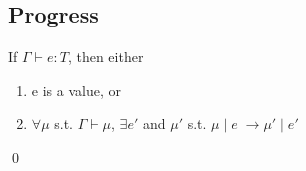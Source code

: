 \documentclass{llncs}
\numberwithin{subcase}{case}
\numberwithin{case}{theorem}
\numberwithin{case}{lemma}
\begin{document}
\subsection{Progress}
\begin{theorem}[Progress]
If $\Gamma \vdash e : T$, then either
\begin{enumerate}
\item e is a value, or
\item $\forall \mu$ s.t.
		   $\Gamma \vdash \mu$,
         $\exists e'$ and $\mu'$ s.t. 
         $\mu \; | \; e \; \rightarrow \mu' \; | \; e'$
\end{enumerate}
\end{theorem}
\qed 








\end{document}
